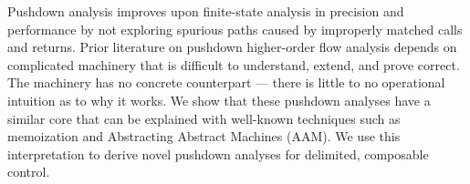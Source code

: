 Pushdown analysis improves upon finite-state analysis in precision and performance by not exploring spurious paths caused by improperly matched calls and returns.
%
Prior literature on pushdown higher-order flow analysis depends on complicated machinery that is difficult to understand, extend, and prove correct.
%
The machinery has no concrete counterpart --- there is little to no operational intuition as to why it works.
%
We show that these pushdown analyses have a similar core that can be explained with well-known techniques such as memoization and Abstracting Abstract Machines (AAM).
%
We use this interpretation to derive novel pushdown analyses for delimited, composable control.